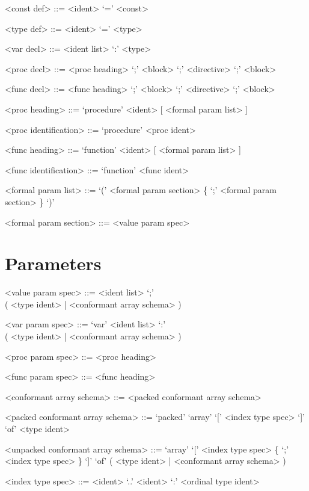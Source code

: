 \documentclass{article}
\begin{document}
{
  \begin{grammar}
    <const def> ::= <ident> `=' <const>

    <type def> ::= <ident> `=' <type>

    <var decl> ::= <ident list> `:' <type>

    <proc decl> ::= <proc heading> `;' <block>  `;' <directive>  `;' <block>

    <func decl> ::= <func heading> `;' <block>  `;' <directive>  `;' <block>

    <proc heading> ::= `procedure' <ident> [ <formal param list> ]
    
    <proc identification> ::= `procedure' <proc ident>

    <func heading> ::= `function' <ident> [ <formal param list> ]
    
    <func identification> ::= `function' <func ident>

    <formal param list> ::= `(' <formal param section>
    \{ `;' <formal param section> \} `)'

    <formal param section> ::= <value param spec>   
  \end{grammar}
}

\section{Parameters}

{
  \begin{grammar}
    <value param spec> ::= <ident list> `;' \\
    ( <type ident> | <conformant array schema> )

    <var param spec> ::= `var' <ident list> `:' \\
    ( <type ident> | <conformant array schema> )

    <proc param spec> ::= <proc heading>

    <func param spec> ::= <func heading>

    <conformant array schema> ::= <packed conformant array schema> 

    <packed conformant array schema> ::= `packed' `array' `[' <index type spec> `]' `of' <type ident>

    <unpacked conformant array schema> ::= `array' `[' <index type spec> \{ `;' <index type spec> \} `]' `of' ( <type ident> | <conformant array schema> )

    <index type spec> ::= <ident> `..' <ident> `:' <ordinal type ident>
  \end{grammar}
}
\end{document}
